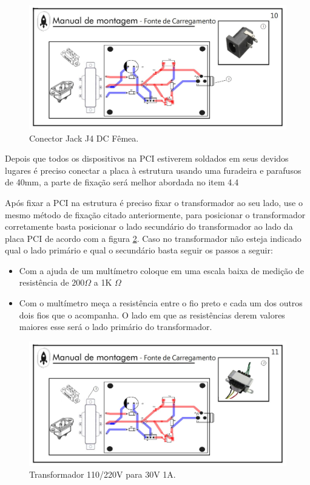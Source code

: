\begin{figure}[H]
  \centering
  \includegraphics[width=\textwidth]{Figuras/Carregador/carregador_manual_10.jpg}
  \caption{Conector Jack J4 DC Fêmea.} 
  \label{carregador10}
\end{figure}

Depois que todos os dispositivos na PCI estiverem soldados em seus devidos lugares é preciso conectar a placa à estrutura usando uma furadeira e parafusos de 40mm, a parte de fixação será melhor abordada no item 4.4 

Após fixar a PCI na estrutura é preciso fixar o transformador ao seu lado, use o mesmo método de fixação citado anteriormente, para posicionar o transformador corretamente basta posicionar o lado secundário do transformador ao lado da placa PCI de acordo com a figura \ref{carregador11}. Caso no transformador não esteja indicado qual o lado primário e qual o secundário basta seguir os passos a seguir:


\begin{itemize}
    \item Com a ajuda de um multímetro coloque em uma escala baixa de medição de resistência de $200\Omega$ a 1K $\Omega$ 
    \item Com o multímetro meça a resistência entre o fio preto e cada um dos outros dois fios que o acompanha. O lado em que as resistências derem valores maiores esse será o lado primário do transformador.
\end{itemize}


\begin{figure}[H]
  \centering
  \includegraphics[width=\textwidth]{Figuras/Carregador/carregador_manual_11.jpg}
  \caption{Transformador 110/220V para 30V 1A.} 
  \label{carregador11}
\end{figure}

